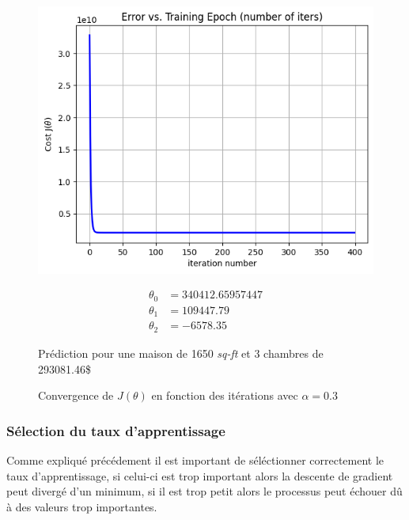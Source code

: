\begin{figure}[!h]
    \begin{minipage}{.48\linewidth}
        \begin{center}
            \includegraphics[width=1\textwidth]{./img/5-2.png}
            \caption{\label{fig:fig4}Convergence de $J(\theta)$ en fonction des itérations avec $\alpha = 0.3$}  
        \end{center}
    \end{minipage}\hfill
    \begin{minipage}{.48\linewidth}
        \begin{equation*}
            \begin{aligned}
                \theta_0 &= 340412.65957447 \\
                \theta_1 &= 109447.79 \\
                \theta_2 &= -6578.35
            \end{aligned}
        \end{equation*}  

        Prédiction pour une maison de 1650 \textit{sq-ft} et 3 chambres de 293081.46\$
    \end{minipage}
\end{figure}

\subsubsection{Sélection du taux d'apprentissage}

Comme expliqué précédement il est important de séléctionner correctement le taux d'apprentissage, si celui-ci est trop important alors la descente de gradient peut divergé d'un minimum, si il est trop petit alors le processus peut échouer dû à des 
valeurs trop importantes.

